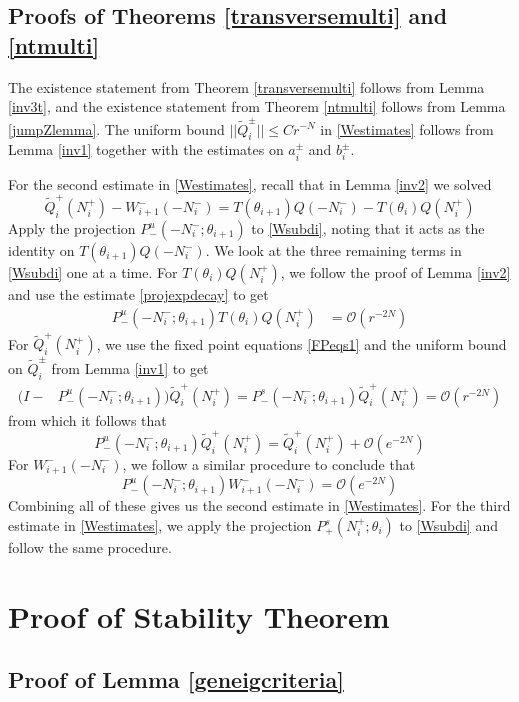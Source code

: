 \documentclass[12pt]{article}
\begin{document}
\subsection{Proofs of Theorems \ref{transversemulti} and \ref{ntmulti}}
The existence statement from Theorem \ref{transversemulti} follows from Lemma \ref{inv3t}, and the existence statement from Theorem \ref{ntmulti} follows from Lemma \ref{jumpZlemma}. The uniform bound $||\tilde{Q}_i^\pm|| \leq C r^{-N}$ in \eqref{Westimates} follows from Lemma \ref{inv1} together with the estimates on $a_i^\pm$ and $b_i^\pm$. 

For the second estimate in \eqref{Westimates}, recall that in Lemma \ref{inv2} we solved
\begin{equation}\label{Wsubdi}
\tilde{Q}_i^+(N_i^+) - W_{i+1}^-(-N_i^-) = T(\theta_{i+1}) Q(-N_i^-) - T(\theta_i) Q(N_i^+)
\end{equation}
Apply the projection $P^u_-(-N_i^-; \theta_{i+1})$ to \eqref{Wsubdi}, noting that it acts as the identity on $T(\theta_{i+1}) Q(-N_i^-)$. We look at the three remaining terms in \eqref{Wsubdi} one at a time. For $T(\theta_i) Q(N_i^+)$, we follow the proof of Lemma \ref{inv2} and use the estimate \ref{projexpdecay} to get
\begin{align*}
P^u_-(-N_i^-; \theta_{i+1})T(\theta_i) Q(N_i^+)
&= \mathcal{O}(r^{-2N})
\end{align*}
For $\tilde{Q}_i^+(N_i^+)$, we use the fixed point equations \eqref{FPeqs1} and the uniform bound on $\tilde{Q}_i^\pm$ from Lemma \ref{inv1} to get
\begin{align*}
(I - &P^u_-(-N_i^-; \theta_{i+1})) \tilde{Q}_i^+(N_i^+) = P^s_-(-N_i^-; \theta_{i+1}) \tilde{Q}_i^+(N_i^+) = \mathcal{O}(r^{-2N})
\end{align*}
from which it follows that
\[
P^u_-(-N_i^-; \theta_{i+1}) \tilde{Q}_i^+(N_i^+) = \tilde{Q}_i^+(N_i^+) + \mathcal{O}(e^{-2N})
\]
For $W_{i+1}^-(-N_i^-)$, we follow a similar procedure to conclude that
\[
P^u_-(-N_i^-; \theta_{i+1}) W_{i+1}^-(-N_i^-) = \mathcal{O}(e^{-2N})
\]
Combining all of these gives us the second estimate in \eqref{Westimates}. For the third estimate in \eqref{Westimates}, we apply the projection $P^s_+(N_i^+; \theta_i)$ to \eqref{Wsubdi} and follow the same procedure.

\section{Proof of Stability Theorem}

\subsection{Proof of Lemma \ref{geneigcriteria}}
\end{document}
